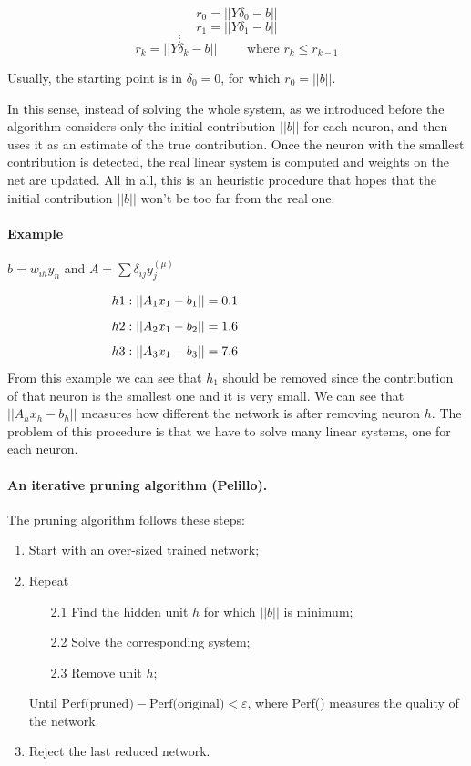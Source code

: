 $$r_0 = || Y \delta_0 - b ||$$
$$r_1 = || Y \delta_1 - b ||$$
$$\vdots \hspace{9em}$$
$$r_k = || Y \delta_k - b || \qquad \text{ where } r_k \leq r_{k-1}$$

Usually, the starting point is in $\delta_0 = 0$, for which $r_0 = ||b||$.

In this sense, instead of solving the whole system, as we introduced before the algorithm considers only the initial contribution $||b||$ for each neuron, and then uses it as an estimate of the true contribution. Once the neuron with the smallest contribution is detected, the real linear system is computed and weights on the net are updated. All in all, this is an heuristic procedure that hopes that the initial contribution $||b||$ won't be too far from the real one.

\paragraph{Example} $b = w_{ih}y_n$ and $A= \sum\delta_{ij}y_j^{(\mu)}$

$$h1: \vert \vert A_1x_1 - b_1 \vert \vert  = 0.1 \hspace{9.7em} $$
$$h2: \vert \vert A_2x_1 - b_2 \vert \vert  = 1.6 \hspace{9.7em} $$
$$h3: \vert \vert A_3x_1 - b_3 \vert \vert  = 7.6 \hspace{9.7em} $$
From this example we can see that $h_1$ should be removed since the contribution of that neuron is the smallest one and it is very small. We can see that $ \vert \vert A_hx_h - b_h\vert \vert$ measures how different the network is after removing neuron $h$.
The problem of this procedure is that we have to solve many linear systems, one for each neuron.

\paragraph*{An iterative pruning algorithm (Pelillo).}
The pruning algorithm follows these steps:
\begin{enumerate}
	\item Start with an over-sized trained network;
	\item Repeat
	\begin{enumerate}
		\item[2.1] Find the hidden unit $h$ for which $\vert \vert b \vert \vert$ is minimum;
		\item[2.2] Solve the corresponding system;
		\item[2.3] Remove unit $h$;
	\end{enumerate}
	Until $\text{Perf(pruned)} - \text{Perf(original)} < \varepsilon$, where Perf() measures the quality of the network.
	\item Reject the last reduced network.
\end{enumerate}

